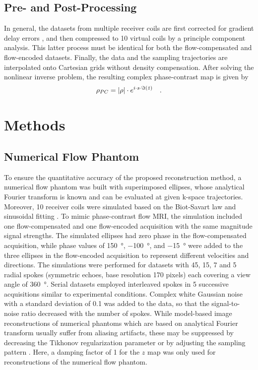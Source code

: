 \subsection{Pre- and Post-Processing}
In general, the datasets from multiple receiver coils are first corrected for gradient delay errors \cite{2015_PC_Asym}, and then compressed to \num{10} virtual coils by a principle component analysis. This latter process must be identical for both the flow-compensated and flow-encoded datasets. Finally, the data and the sampling trajectories are interpolated onto Cartesian grids without density compensation. After solving the nonlinear inverse problem, the resulting complex phase-contrast map is given by
\begin{equation} \label{Equ:post_PC}
  \rho_{PC} = \lvert\rho\rvert \cdot e^{i \cdot s \cdot \Im(\hat{z})} \quad .
\end{equation}


\section{Methods}
\subsection{Numerical Flow Phantom}
To ensure the quantitative accuracy of the proposed reconstruction method, a numerical flow phantom was built with superimposed ellipses, whose analytical Fourier transform is known and can be evaluated at given k-space trajectories. Moreover, \num{10} receiver coils were simulated based on the Biot-Savart law and sinusoidal fitting \cite{2012_analSim}. To mimic phase-contrast flow MRI, the simulation included one flow-compensated and one flow-encoded acquisition with the same magnitude signal strengths. The simulated ellipses had zero phase in the flow-compensated acquisition, while phase values of \SI{150}{\degree}, \SI{-100}{\degree}, and \SI{-15}{\degree} were added to the three ellipses in the flow-encoded acquisition to represent different velocities and directions. The simulations were performed for datasets with \num{45}, \num{15}, \num{7} and \num{5} radial spokes (symmetric echoes, base resolution \num{170} pixels) each covering a view angle of \SI{360}{\degree}. Serial datasets employed interleaved spokes in \num{5} successive acquisitions similar to experimental conditions. Complex white Gaussian noise with a standard deviation of \num{0.1} was added to the data, so that the signal-to-noise ratio decreased with the number of spokes. While model-based image reconstructions of numerical phantoms which are based on analytical Fourier transform usually suffer from aliasing artifacts, these may be suppressed by decreasing the Tikhonov regularization parameter or by adjusting the sampling pattern \cite{2011_T2_Sumpf}. Here, a damping factor of \num{1} for the $z$ map was only used for reconstructions of the numerical flow phantom.


